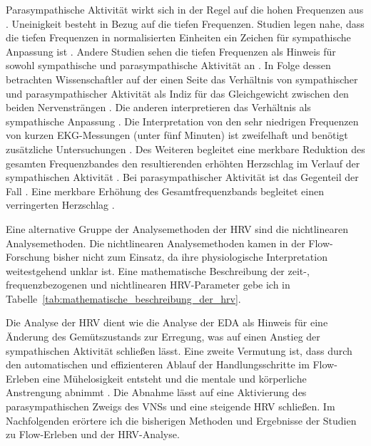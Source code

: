 Parasympathische Aktivität wirkt sich in der Regel auf die hohen Frequenzen aus \citep[vgl.][S.~365]{TaskForce1996}. Uneinigkeit besteht in Bezug auf die tiefen Frequenzen. Studien legen nahe, dass die tiefen Frequenzen in normalisierten Einheiten ein Zeichen für sympathische Anpassung ist \citep[vgl.][S.~365]{TaskForce1996}. Andere Studien sehen die tiefen Frequenzen als Hinweis für sowohl sympathische und parasympathische Aktivität an \citep[vgl.][S.~365]{TaskForce1996}. In Folge dessen betrachten Wissenschaftler auf der einen Seite das Verhältnis von sympathischer und parasympathischer Aktivität als Indiz für das Gleichgewicht zwischen den beiden Nervensträngen \citep[vgl.][S.~365]{TaskForce1996}. Die anderen interpretieren das Verhältnis als sympathische Anpassung \citep[vgl.][S.~365]{TaskForce1996}. Die Interpretation von den sehr niedrigen Frequenzen von kurzen \ac{EKG}-Messungen (unter fünf Minuten) ist zweifelhaft und benötigt zusätzliche Untersuchungen \citep[vgl.][S.~365]{TaskForce1996}. Des Weiteren begleitet eine merkbare Reduktion des gesamten Frequenzbandes den resultierenden erhöhten Herzschlag im Verlauf der sympathischen Aktivität \citep[vgl.][S.~366]{TaskForce1996}. Bei parasympathischer Aktivität ist das Gegenteil der Fall \citep[vgl.][S.~366]{TaskForce1996}. Eine merkbare Erhöhung des Gesamtfrequenzbands begleitet einen verringerten Herzschlag \citep[vgl.][S.~366]{TaskForce1996}.

Eine alternative Gruppe der Analysemethoden der \ac{HRV} sind die nichtlinearen Analysemethoden. Die nichtlinearen Analysemethoden kamen in der Flow-Forschung bisher nicht zum Einsatz, da ihre physiologische Interpretation weitestgehend unklar ist. Eine mathematische Beschreibung der zeit-, frequenzbezogenen und nichtlinearen \ac{HRV}-Parameter gebe ich in Tabelle~\ref{tab:mathematische_beschreibung_der_hrv}.

Die Analyse der \ac{HRV} dient wie die Analyse der \ac{EDA} als Hinweis für eine Änderung des Gemütszustands zur Erregung, was auf einen Anstieg der sympathischen Aktivität schließen lässt. Eine zweite Vermutung ist, dass durch den automatischen und effizienteren Ablauf der Handlungsschritte im Flow-Erleben eine Mühelosigkeit entsteht und die mentale und körperliche Anstrengung abnimmt \citep[vgl.][S.~308]{deManzano2010}. Die Abnahme lässt auf eine Aktivierung des parasympathischen Zweigs des \ac{VNS}s und eine steigende \ac{HRV} schließen. Im Nachfolgenden erörtere ich die bisherigen Methoden und Ergebnisse der Studien zu Flow-Erleben und der \ac{HRV}-Analyse.

